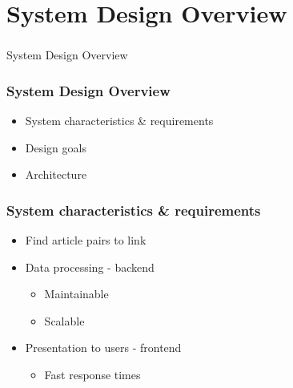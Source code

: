 \section[System Design Overview]{System Design Overview}

\begin{frame}
  \frametitle{}
  \begin{center}
    {\Huge System Design Overview}
  \end{center}
\end{frame}

\begin{frame}
    \frametitle{System Design Overview}
    \centering
    \begin{itemize}
      \item System characteristics \& requirements
      \item Design goals
      \item Architecture
    \end{itemize}
\end{frame}

\begin{frame}
    \frametitle{System characteristics \& requirements}
    \centering
    \begin{itemize}
      \item Find article pairs to link
      \item Data processing - backend
      \begin{itemize}
        \item Maintainable
        \item Scalable
      \end{itemize}
      \item Presentation to users - frontend
      \begin{itemize}
        \item Fast response times
      \end{itemize}
    \end{itemize}
\end{frame}

